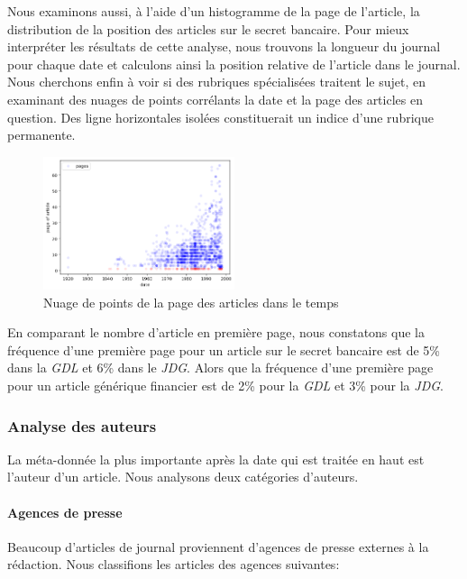 Nous examinons aussi, à l'aide d'un histogramme de la page de l'article,
la distribution de la position des articles sur le secret bancaire. Pour
mieux interpréter les résultats de cette analyse, nous trouvons la
longueur du journal pour chaque date et calculons ainsi la position
relative de l'article dans le journal. Nous cherchons enfin à voir si
des rubriques spécialisées traitent le sujet, en examinant des nuages de
points corrélants la date et la page des articles en question. Des ligne
horizontales isolées constituerait un indice d'une rubrique permanente.

\begin{figure}
\centering
\includegraphics[width=0.5\textwidth,height=\textheight]{scatter.png}
\caption{Nuage de points de la page des articles dans le temps}
\end{figure}

En comparant le nombre d'article en première page, nous constatons que
la fréquence d'une première page pour un article sur le secret bancaire
est de 5\% dans la \emph{GDL} et 6\% dans le \emph{JDG}. Alors que la
fréquence d'une première page pour un article générique financier est de
2\% pour la \emph{GDL} et 3\% pour la \emph{JDG}.

\hypertarget{analyse-des-auteurs}{%
\subsubsection{Analyse des auteurs}\label{analyse-des-auteurs}}

La méta-donnée la plus importante après la date qui est traitée en haut
est l'auteur d'un article. Nous analysons deux catégories d'auteurs.

\hypertarget{agences-de-presse}{%
\paragraph{Agences de presse}\label{agences-de-presse}}

Beaucoup d'articles de journal proviennent d'agences de presse externes
à la rédaction. Nous classifions les articles des agences suivantes:

